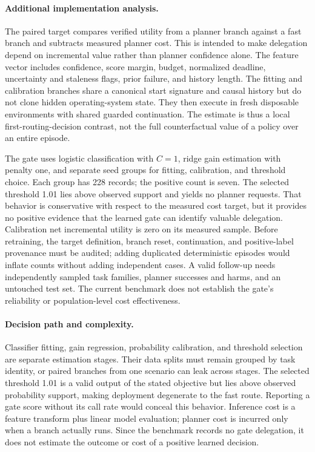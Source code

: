 \paragraph{Additional implementation analysis.} The paired target compares verified utility from a planner branch against a fast branch and subtracts measured planner cost. This is intended to make delegation depend on incremental value rather than planner confidence alone. The feature vector includes confidence, score margin, budget, normalized deadline, uncertainty and staleness flags, prior failure, and history length. The fitting and calibration branches share a canonical start signature and causal history but do not clone hidden operating-system state. They then execute in fresh disposable environments with shared guarded continuation. The estimate is thus a local first-routing-decision contrast, not the full counterfactual value of a policy over an entire episode.

The gate uses logistic classification with $C=1$, ridge gain estimation with penalty one, and separate seed groups for fitting, calibration, and threshold choice. Each group has 228 records; the positive count is seven. The selected threshold 1.01 lies above observed support and yields no planner requests. That behavior is conservative with respect to the measured cost target, but it provides no positive evidence that the learned gate can identify valuable delegation. Calibration net incremental utility is zero on its measured sample. Before retraining, the target definition, branch reset, continuation, and positive-label provenance must be audited; adding duplicated deterministic episodes would inflate counts without adding independent cases. A valid follow-up needs independently sampled task families, planner successes and harms, and an untouched test set. The current benchmark does not establish the gate's reliability or population-level cost effectiveness.


\paragraph{Decision path and complexity.} Classifier fitting, gain regression, probability calibration, and threshold selection are separate estimation stages. Their data splits must remain grouped by task identity, or paired branches from one scenario can leak across stages. The selected threshold 1.01 is a valid output of the stated objective but lies above observed probability support, making deployment degenerate to the fast route. Reporting a gate score without its call rate would conceal this behavior. Inference cost is a feature transform plus linear model evaluation; planner cost is incurred only when a branch actually runs. Since the benchmark records no gate delegation, it does not estimate the outcome or cost of a positive learned decision.

